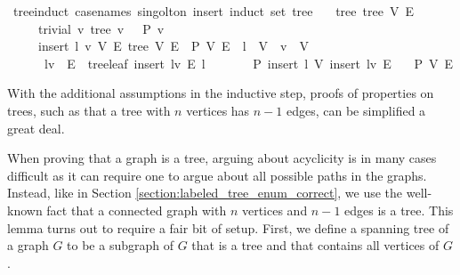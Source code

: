 \begin{isabellebox}
    \isamarkupfalse%
    \ tree{\isacharunderscore}{\kern0pt}induct\ {\isacharbrackleft}{\kern0pt}case{\isacharunderscore}{\kern0pt}names\ singolton\ insert{\isacharcomma}{\kern0pt}\ induct\ set{\isacharcolon}{\kern0pt}\ tree{\isacharbrackright}{\kern0pt}{\isacharcolon}{\kern0pt}\isanewline
    \ \ \ tree{\isacharcolon}{\kern0pt}\ {\isachardoublequoteopen}tree\ V\ E{\isachardoublequoteclose}\isanewline
    \ \ \ \ \ trivial{\isacharcolon}{\kern0pt}\ {\isachardoublequoteopen}{\isasymAnd}v{\isachardot}{\kern0pt}\ tree\ {\isacharbraceleft}{\kern0pt}v{\isacharbraceright}{\kern0pt}\ {\isacharbraceleft}{\kern0pt}{\isacharbraceright}{\kern0pt}\ {\isasymLongrightarrow}\ P\ {\isacharbraceleft}{\kern0pt}v{\isacharbraceright}{\kern0pt}\ {\isacharbraceleft}{\kern0pt}{\isacharbraceright}{\kern0pt}{\isachardoublequoteclose}\isanewline
    \ \ \ \ \ insert{\isacharcolon}{\kern0pt}\ {\isachardoublequoteopen}{\isasymAnd}l\ v\ V\ E{\isachardot}{\kern0pt}\ tree\ V\ E\ {\isasymLongrightarrow}\ P\ V\ E\ {\isasymLongrightarrow}\ l\ {\isasymnotin}\ V\ {\isasymLongrightarrow}\ v\ {\isasymin}\ V\ {\isasymLongrightarrow}\isanewline
    \ \ \ \ \ \ {\isacharbraceleft}{\kern0pt}l{\isacharcomma}{\kern0pt}v{\isacharbraceright}{\kern0pt}\ {\isasymnotin}\ E\ {\isasymLongrightarrow}\ tree{\isachardot}{\kern0pt}leaf\ {\isacharparenleft}{\kern0pt}insert\ {\isacharbraceleft}{\kern0pt}l{\isacharcomma}{\kern0pt}v{\isacharbraceright}{\kern0pt}\ E{\isacharparenright}{\kern0pt}\ l\ {\isasymLongrightarrow}\isanewline
    \ \ \ \ \ \ P\ {\isacharparenleft}{\kern0pt}insert\ l\ V{\isacharparenright}{\kern0pt}\ {\isacharparenleft}{\kern0pt}insert\ {\isacharbraceleft}{\kern0pt}l{\isacharcomma}{\kern0pt}v{\isacharbraceright}{\kern0pt}\ E{\isacharparenright}{\kern0pt}{\isachardoublequoteclose}\isanewline
    \ \ \ {\isachardoublequoteopen}P\ V\ E{\isachardoublequoteclose}
\end{isabellebox}

With the additional assumptions in the inductive step, proofs of properties on trees, such as that a tree with $n$ vertices has $n-1$ edges, can be simplified a great deal.

When proving that a graph is a tree, arguing about acyclicity is in many cases difficult as it can require one to argue about all possible paths in the graphs.
Instead, like in Section \ref{section:labeled_tree_enum_correct}, we use the well-known fact that a connected graph with $n$ vertices and $n-1$ edges is a tree.
This lemma turns out to require a fair bit of setup.
First, we define a spanning tree of a graph $G$ to be a subgraph of $G$ that is a tree and that contains all vertices of $G$.

